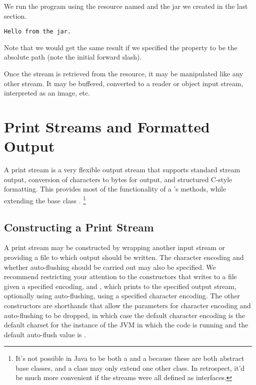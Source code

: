 We run the program using the resource named 
and the jar we created in the last section.
%
\begin{verbatim}
Hello from the jar.
\end{verbatim}
%
Note that we would get the same result if we specified the
 property to be the absolute path
 (note the initial forward
slash).

Once the stream is retrieved from the resource, it may be
manipulated like any other stream.  It may be buffered,
converted to a reader or object input stream, interpreted as
an image, etc.



\section{Print Streams and Formatted Output}\label{section:io-printstream-format}

A print stream is a very flexible output stream that supports standard
stream output, conversion of characters to bytes for output, and
structured C-style formatting.  This provides most of the
functionality of a 's methods, while extending the base
class .%
%
\footnote{It's not possible in Java to be both a  and a
   because these are both abstract base classes, and
  a class may only extend one other class.  In retrospect, it'd be
  much more convenient if the streams were all defined as interfaces.}

\subsection{Constructing a Print Stream}

A print stream may be constructed by wrapping another input stream or
providing a file to which output should be written.  The character
encoding and whether auto-flushing should be carried out may also be
specified.  We recommend restricting your attention to the
constructors  that writes to a file
given a specified encoding, and
, which prints to the
specified output stream, optionally using auto-flushing, using a
specified character encoding.  
The other constructors are shorthands that allow the parameters for
character encoding and auto-flushing to be dropped, in which case
the default character encoding is the default charset for the instance
of the JVM in which the code is running and the default auto-flush
value is .

